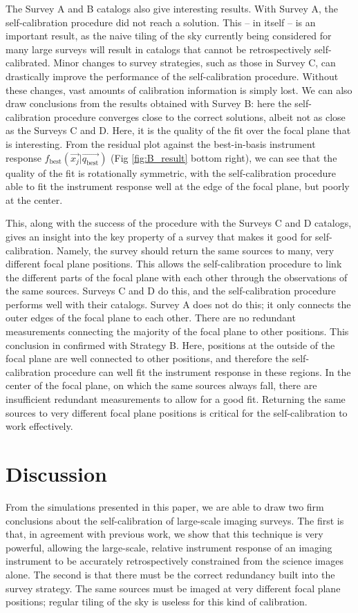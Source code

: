 \documentclass[preprint,pdftex]{aastex}
\newcommand{\basis}{\text{best}}
\begin{document}
The Survey A and B catalogs also give interesting results. With Survey A, the self-calibration procedure did not reach a solution. This -- in itself -- is an important result, as the naive tiling of the sky currently being considered for many large surveys will result in catalogs that cannot be retrospectively self-calibrated. Minor changes to survey strategies, such as those in Survey C, can drastically improve the performance of the self-calibration procedure. Without these changes, vast amounts of calibration information is simply lost. We can also draw conclusions from the results obtained with Survey B: here the self-calibration procedure converges close to the correct solutions, albeit not as close as the Surveys C and D. Here, it is the quality of the fit over the focal plane that is interesting. From the residual plot against the best-in-basis instrument response $f_\basis(\vec{x_j} | \vec{q_\basis})$ (Fig \ref{fig:B_result} bottom right), we can see that the quality of the fit is rotationally symmetric, with the self-calibration procedure able to fit the instrument response well at the edge of the focal plane, but poorly at the center. 

This, along with the success of the procedure with the Surveys C and D catalogs, gives an insight into the key property of a survey that makes it good for self-calibration. Namely, the survey should return the same sources to many, very different focal plane positions. This allows the self-calibration procedure to link the different parts of the focal plane with each other through the observations of the same sources. Surveys C and D do this, and the self-calibration procedure performs well with their catalogs. Survey A does not do this; it only connects the outer edges of the focal plane to each other. There are no redundant measurements connecting the majority of the focal plane to other positions. This conclusion in confirmed with Strategy B. Here, positions at the outside of the focal plane are well connected to other positions, and therefore the self-calibration procedure can well fit the instrument response in these regions. In the center of the focal plane, on which the same sources always fall, there are insufficient redundant measurements to allow for a good fit. Returning the same sources to very different focal plane positions is critical for the self-calibration to work effectively. 

\section{Discussion}
From the simulations presented in this paper, we are able to draw two firm conclusions about the self-calibration of large-scale imaging surveys. The first is that, in agreement with previous work, we show that this technique is very powerful, allowing the large-scale, relative instrument response of an imaging instrument to be accurately retrospectively constrained from the science images alone. The second is that there must be the correct redundancy built into the survey strategy. The same sources must be imaged at very different focal plane positions; regular tiling of the sky is useless for this kind of calibration. 
\end{document}
